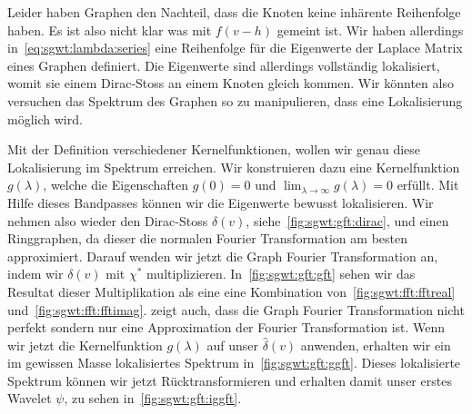 Leider haben Graphen den Nachteil, dass die Knoten keine inh\"arente 
Reihenfolge haben. Es ist also nicht klar was mit $f(v - h)$ gemeint ist. Wir 
haben allerdings in~\cref{eq:sgwt:lambda:series} eine Reihenfolge f\"ur die 
Eigenwerte der Laplace Matrix eines Graphen definiert. Die Eigenwerte sind 
allerdings vollst\"andig lokalisiert, womit sie einem Dirac-Stoss an einem 
Knoten gleich kommen. Wir k\"onnten also versuchen das Spektrum des Graphen so 
zu manipulieren, dass eine Lokalisierung m\"oglich wird.

Mit der Definition verschiedener Kernelfunktionen, wollen wir genau diese 
Lokalisierung im Spektrum erreichen. Wir konstruieren dazu eine Kernelfunktion 
$g(\lambda)$, welche die Eigenschaften $g(0) = 0$ und $\lim_{\lambda\to\infty} 
g(\lambda) = 0$ erf\"ullt. Mit Hilfe dieses Bandpasses k\"onnen wir die 
Eigenwerte bewusst lokalisieren.
Wir nehmen also wieder den Dirac-Stoss $\delta(v)$, 
siehe~\cref{fig:sgwt:gft:dirac}, und einen Ringgraphen, da dieser die normalen 
Fourier Transformation am besten 
approximiert. Darauf wenden wir jetzt die Graph Fourier Transformation an, 
indem wir $\delta(v)$ mit $\chi^*$ multiplizieren.
In~\cref{fig:sgwt:gft:gft} sehen wir das Resultat dieser Multiplikation als eine
eine Kombination von~\cref{fig:sgwt:fft:fftreal} 
und~\cref{fig:sgwt:fft:fftimag}.  zeigt auch, 
dass die Graph Fourier Transformation nicht perfekt sondern nur eine 
Approximation der Fourier Transformation ist. Wenn wir jetzt die Kernelfunktion 
$g(\lambda)$ auf unser $\hat{\delta}(v)$ anwenden, erhalten wir ein im gewissen 
Masse lokalisiertes Spektrum in~\cref{fig:sgwt:gft:ggft}. Dieses lokalisierte 
Spektrum k\"onnen wir jetzt R\"ucktransformieren und erhalten damit unser 
erstes Wavelet $\psi$, zu sehen in~\cref{fig:sgwt:gft:iggft}.
